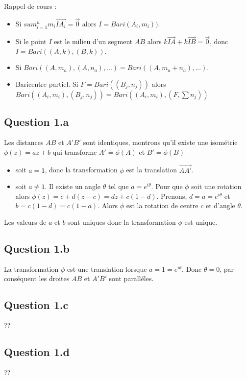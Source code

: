 \documentclass[]{book}
\theoremstyle{definition}
\begin{document}
Rappel de cours :
\begin{itemize}
\item Si $sum_{i=1}^{n} m_i\overrightarrow{IA_i} = \overrightarrow{0}$ alors $I = Bari(A_i, m_i))$.
\item Si le point $I$ est le milieu d'un segment $AB$ alors $k\overrightarrow{IA}+k\overrightarrow{IB} = \overrightarrow{0}$, donc $I=Bari((A,k),(B,k))$.
\item Si $Bari((A,m_a), (A,n_a), ...) = Bari((A,m_a+n_a), ...)$.
\item Baricentre partiel. Si $F = Bari((B_j, n_j))$ alors $Bari((A_i,m_i),(B_j, n_j)) = Bari((A_i,m_i),(F,\sum n_j))$
\end{itemize}


\subsection*{Question 1.a}
Les distances $AB$ et $A'B'$ sont identiques, montrons qu'il existe une isom\'etrie $\phi(z) =  az+ b$ qui transforme $A' = \phi(A)$ et $B' = \phi(B)$ 
\begin{itemize}
\item soit $a=1$, donc la transformation $\phi$ est la translation $\overrightarrow{AA'}$.
\item soit $a \neq 1$. Il existe un angle $\theta$ tel que $a=e^{i\theta}$. Pour que $\phi$ soit une rotation alors $\phi(z) =  c + d(z - c) = dz +c(1-d)$. Prenons, $d = a = e^{i\theta}$ et $b=c(1-d)=c(1-a)$. Alors $\phi$ est la rotation de centre $c$ et d'angle $\theta$. 
\end{itemize}

Les valeurs de $a$ et $b$ sont uniques donc la transformation $\phi$ est unique.

\subsection*{Question 1.b}
La transformation $\phi$ est une translation lorsque $a=1=e^{i\theta}$. Donc $\theta = 0$, par cons\'equent les droites $AB$ et $A'B'$ sont parall\'eles. 

\subsection*{Question 1.c}
??


\subsection*{Question 1.d}
??
\end{document}
